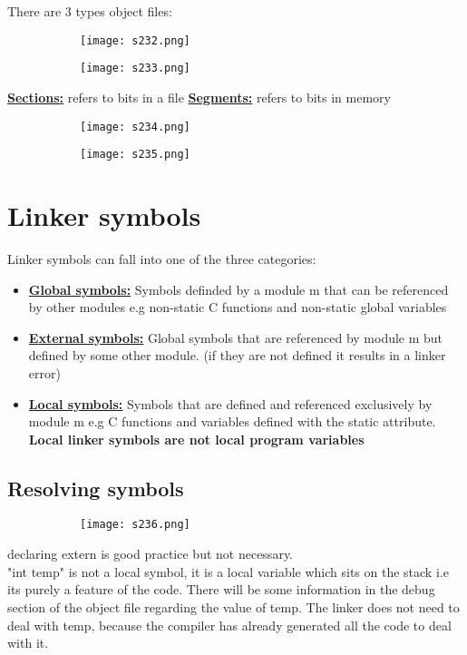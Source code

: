 \documentclass[8pt]{extreport}
\begin{document}
There are 3 types object files:
\begin{figure}[H]
\centering
\begin{subfigure}[b]{0.4\linewidth}
\texttt{[image: s232.png]}
\end{subfigure}
\begin{subfigure}[b]{0.4\linewidth}
\texttt{[image: s233.png]}
\end{subfigure}
\end{figure}
\underline{\textbf{Sections:}} refers to bits in a file
\underline{\textbf{Segments:}} refers to bits in memory
\begin{figure}[H]
\centering
\begin{subfigure}[b]{0.4\linewidth}
\texttt{[image: s234.png]}
\end{subfigure}
\begin{subfigure}[b]{0.4\linewidth}
\texttt{[image: s235.png]}
\end{subfigure}
\end{figure}
\section{Linker symbols}

Linker symbols can fall into one of the three categories:
\begin{itemize}
\item \textbf{\underline{Global symbols:}} Symbols definded by a module m that can be referenced by other modules e.g non-static C functions and non-static global variables
\item \textbf{\underline{External symbols:}} Global symbols that are referenced by module m but defined by some other module. (if they are not defined it results in a linker error)
\item \textbf{\underline{Local symbols:}} Symbols that are defined and referenced exclusively by module m e.g C functions and variables defined with the static attribute. \textbf{Local linker symbols are not local program variables}
\end{itemize}

\subsection{Resolving symbols}
\begin{figure}[H]
\centering
\begin{subfigure}[b]{0.4\linewidth}
\texttt{[image: s236.png]}
\end{subfigure}
\end{figure}
declaring extern is good practice but not necessary.\\
"int temp" is not a local symbol, it is a local variable which sits on the stack i.e its purely a feature of the code. There will be some information in the debug section of the object file regarding the value of temp. The linker does not need to deal with temp, because the compiler has already generated all the code to deal with it.
\end{document}
